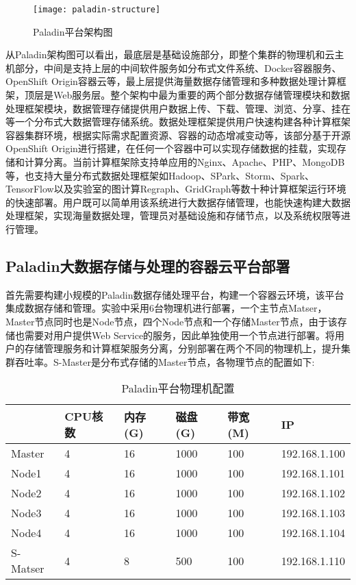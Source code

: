 \begin{figure}[H] %
	\centering
	\texttt{[image: paladin-structure]}
	\caption{Paladin平台架构图}
\end{figure}

从Paladin架构图可以看出，最底层是基础设施部分，即整个集群的物理机和云主机部分，中间是支持上层的中间软件服务如分布式文件系统、Docker容器服务、OpenShift Origin容器云等，最上层提供海量数据存储管理和多种数据处理计算框架，顶层是Web服务层。整个架构中最为重要的两个部分数据存储管理模块和数据处理框架模块，数据管理存储提供用户数据上传、下载、管理、浏览、分享、挂在等一个分布式大数据管理存储系统。数据处理框架提供用户快速构建各种计算框架容器集群环境，根据实际需求配置资源、容器的动态增减变动等，该部分基于开源OpenShift Origin进行搭建，在任何一个容器中可以实现存储数据的挂载，实现存储和计算分离。当前计算框架除支持单应用的Nginx、Apache、PHP、MongoDB等，也支持大量分布式数据处理框架如Hadoop、SPark、Storm、Spark、TensorFlow以及实验室的图计算Regraph、GridGraph等数十种计算框架运行环境的快速部署。用户既可以简单用该系统进行大数据存储管理，也能快速构建大数据处理框架，实现海量数据处理，管理员对基础设施和存储节点，以及系统权限等进行管理。

\subsection{Paladin大数据存储与处理的容器云平台部署}
首先需要构建小规模的Paladin数据存储处理平台，构建一个容器云环境，该平台集成数据存储和管理。实验中采用6台物理机进行部署，一个主节点Matser，Master节点同时也是Node节点，四个Node节点和一个存储Master节点，由于该存储也需要对用户提供Web Service的服务，因此单独使用一个节点进行部署。将用户的存储管理服务和计算框架服务分离，分别部署在两个不同的物理机上，提升集群吞吐率。S-Master是分布式存储的Master节点，各物理节点的配置如下:
\begin{table}[H]
	\centering\dawu[1.3]
	\caption{Paladin平台物理机配置}
	\begin{tabular}{|p{1.8cm}<{\centering}|p{1.5cm}<{\centering}|p{1.5cm}<{\centering}|p{1.5cm}<{\centering}|p{1.5cm}<{\centering}|p{3cm}<{\centering}|} \hline
		\diagbox[innerwidth=1.8cm]{节点}{资源} & CPU核数 & 内存(G) & 磁盘(G) & 带宽(M) & IP \\ \hline
		Master & 4 & 16 & 1000 & 100 & 192.168.1.100  \\ \hline
		Node1 & 4 & 16 & 1000 & 100  & 192.168.1.101 \\ \hline
		Node2 & 4 & 16 & 1000 & 100  & 192.168.1.102 \\ \hline
		Node3 & 4 & 16 & 1000 & 100  & 192.168.1.103 \\ \hline
		Node4 & 4 & 16 & 1000 & 100  & 192.168.1.104 \\ \hline
		S-Matser & 4 & 8 & 500 & 100  & 192.168.1.110 \\ \hline
	\end{tabular}
\end{table}

